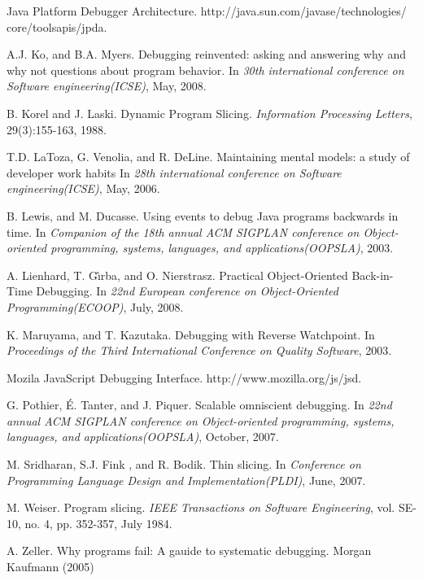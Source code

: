 \documentclass{sig-alternate}
\begin{document}
\begin{thebibliography}{16}
Java Platform Debugger Architecture. \newblock http://java.sun.com/javase/technologies/ core/toolsapis/jpda.

A.J. Ko, and B.A. Myers. \newblock Debugging reinvented: asking and answering why and why not questions about program behavior.
\newblock In \emph{30th international conference on Software engineering(ICSE)},
May, 2008.

B. Korel and J. Laski. \newblock Dynamic Program Slicing.
\newblock \emph{Information Processing Letters},
 29(3):155-163, 1988.

T.D. LaToza, G. Venolia, and R. DeLine. \newblock Maintaining mental models: a study of developer work habits
\newblock In \emph{28th international conference on Software engineering(ICSE)},
May, 2006.

B. Lewis, and M. Ducasse. \newblock Using events to debug Java programs backwards in time.
\newblock In \emph{Companion of the 18th annual ACM SIGPLAN conference on Object-oriented programming, systems, languages, and applications(OOPSLA)},
2003.

A. Lienhard, T. G\^{\i}rba, and O. Nierstrasz. \newblock Practical Object-Oriented Back-in-Time Debugging.
\newblock In \emph{22nd European conference on Object-Oriented Programming(ECOOP)},
July, 2008.

K. Maruyama, and T. Kazutaka. \newblock Debugging with Reverse Watchpoint.
\newblock In \emph{Proceedings of the Third International Conference on Quality Software},
2003.

Mozila JavaScript Debugging Interface. \newblock http://www.mozilla.org/js/jsd.

G. Pothier, \'{E}. Tanter, and J. Piquer. \newblock Scalable omniscient debugging.
\newblock In \emph{22nd annual ACM SIGPLAN conference on Object-oriented programming, systems, languages, and applications(OOPSLA)},
October, 2007.

M. Sridharan, S.J. Fink , and R. Bodik. \newblock Thin slicing.
\newblock In \emph{Conference on Programming Language Design and Implementation(PLDI)},
June, 2007.

M. Weiser. \newblock Program slicing.
\newblock \emph{IEEE Transactions on
Software Engineering}, vol. SE-10, no. 4, pp. 352-357,
July 1984.

A. Zeller. \newblock Why programs fail: A gauide to systematic debugging.
Morgan Kaufmann (2005)

\end{thebibliography}


%
%
\end{document}
